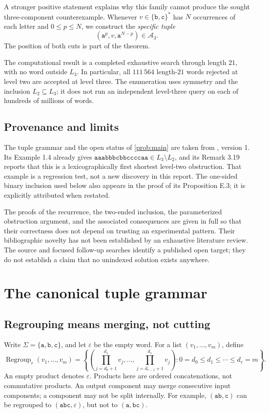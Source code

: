 \documentclass[11pt,letterpaper]{article}
\numberwithin{equation}{section}
\theoremstyle{definition}
\theoremstyle{remark}
\newcommand{\A}{\mathcal A}
\newcommand{\eps}{\varepsilon}
\newcommand{\Reg}{\operatorname{Regroup}}
\renewcommand{\aa}{\mathtt a}
\newcommand{\bb}{\mathtt b}
\newcommand{\cc}{\mathtt c}
\newcommand{\word}[1]{\texttt{#1}}
\begin{document}
A stronger positive statement explains why this family cannot produce the
sought three-component counterexample. Whenever
\(v\in\{\bb,\cc\}^{*}\) has \(N\) occurrences of each letter and
\(0\leq p\leq N\), we construct the \emph{specific tuple}
\[
  (\aa^p,v,\aa^{N-p})\in\A_3.
\]
The position of both cuts is part of the theorem.

The computational result is a completed exhaustive search through length
\(21\), with no word outside \(L_3\). In particular, all
\(111\,564\) length-\(21\) words rejected at level two are accepted at level
three. The enumeration uses symmetry and the inclusion \(L_2\subseteq L_3\);
it does not run an independent level-three query on each of hundreds of
millions of words.

\subsection{Provenance and limits}
The tuple grammar and the open status of \cref{prob:main} are taken from
\cite{Yuyama2026}, version 1. Its Example 1.4 already gives
\(\word{aaabbbcbbccccaa}\in L_3\setminus L_2\), and its Remark 3.19 reports
that this is a lexicographically first shortest level-two obstruction.
That example is a regression test, not a new discovery in this report.
The one-sided binary inclusion used below also appears in the proof of its
Proposition E.3; it is explicitly attributed when restated.

The proofs of the recurrence, the two-ended inclusion, the parameterized
obstruction argument, and the associated consequences are given in full so
that their correctness does not depend on trusting an experimental pattern.
Their bibliographic novelty has not been established by an exhaustive
literature review. The source and focused follow-up searches identify a
published open target; they do not establish a claim that no unindexed
solution exists anywhere.

\section{The canonical tuple grammar}
\label{sec:grammar}

\subsection{Regrouping means merging, not cutting}
Write \(\Sigma=\{\aa,\bb,\cc\}\), and let \(\eps\) be the empty word.
For a list \((v_1,\ldots,v_m)\), define
\begin{equation}\label{eq:regroup}
 \Reg_r(v_1,\ldots,v_m)
 =\left\{\left(\prod_{j=d_0+1}^{d_1}v_j,\ldots,
                   \prod_{j=d_{r-1}+1}^{d_r}v_j\right):
       0=d_0\leq d_1\leq\cdots\leq d_r=m\right\}.
\end{equation}
An empty product denotes \(\eps\). Products here are ordered concatenations,
not commutative products. An output component may merge consecutive input
components; a component may not be split internally. For example,
\((\word{ab},\word{c})\) can be regrouped to
\((\word{abc},\eps)\), but not to
\((\word{a},\word{bc})\).
\end{document}

